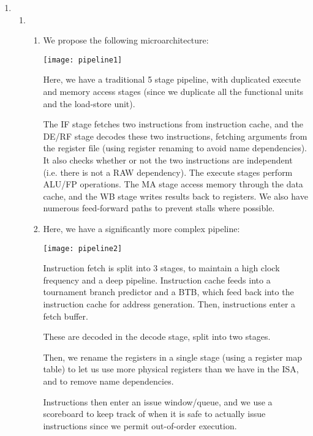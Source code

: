 


\begin{enumerate}[label=(\alph*)]

  \item
    \begin{enumerate}[label=(\roman*)]

      \item
        \begin{enumerate}[label=(\Alph*)]

          \item
            We propose the following microarchitecture:

            \texttt{[image: pipeline1]}

            Here, we have a traditional 5 stage pipeline, with duplicated execute and memory access stages (since we duplicate all the functional units and the load-store unit).

            The IF stage fetches two instructions from instruction cache, and the DE/RF stage decodes these two instructions, fetching arguments from the register file (using register renaming to avoid name dependencies). It also checks whether or not the two instructions are independent (i.e. there is not a RAW dependency). The execute stages perform ALU/FP operations. The MA stage access memory through the data cache, and the WB stage writes results back to registers. We also have numerous feed-forward paths to prevent stalls where possible.

            \item

              Here, we have a significantly more complex pipeline:

              \texttt{[image: pipeline2]}

              Instruction fetch is split into 3 stages, to maintain a high clock frequency and a deep pipeline. Instruction cache feeds into a tournament branch predictor and a BTB, which feed back into the instruction cache for address generation. Then, instructions enter a fetch buffer.

              These are decoded in the decode stage, split into two stages.

              Then, we rename the registers in a single stage (using a register map table) to let us use more physical registers than we have in the ISA, and to remove name dependencies.

              Instructions then enter an issue window/queue, and we use a scoreboard to keep track of when it is safe to actually issue instructions since we permit out-of-order execution.


\end{enumerate}
\end{enumerate}
\end{enumerate}
